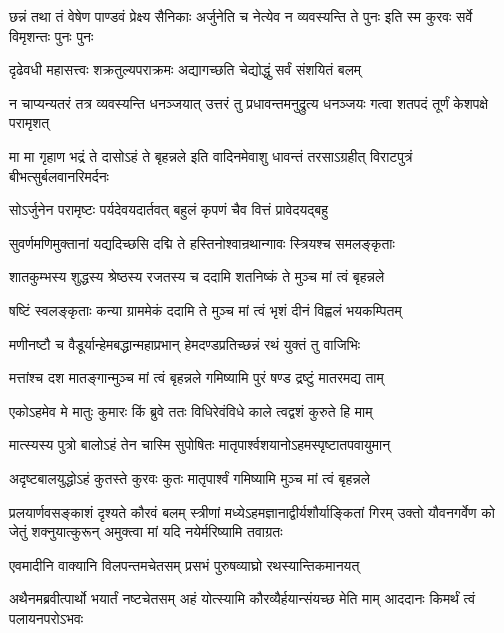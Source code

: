 
\threelineshloka
{छन्नं तथा तं वेषेण पाण्डवं प्रेक्ष्य सैनिकाः}
{अर्जुनेति च नेत्येव न व्यवस्यन्ति ते पुनः}
{इति स्म कुरवः सर्वे विमृशन्तः पुनः पुनः}


\twolineshloka
{दृढेवधी महासत्त्वः शक्रतुल्यपराक्रमः}
{अद्यागच्छति चेद्योद्धुं सर्वं संशयितं बलम्}


\onelineshloka
{न चाप्यन्यतरं तत्र व्यवस्यन्ति धनञ्जयात्}
\twolineshloka
{उत्तरं तु प्रधावन्तमनुद्रुत्य धनञ्जयः}
{गत्वा शतपदं तूर्णं केशपक्षे परामृशत्}


\threelineshloka
{मा मा गृहाण भद्रं ते दासोऽहं ते बृहन्नले}
{इति वादिनमेवाशु धावन्तं तरसाऽग्रहीत्}
{विराटपुत्रं बीभत्सुर्बलवानरिमर्दनः}


\twolineshloka
{सोऽर्जुनेन परामृष्टः पर्यदेवयदार्तवत्}
{बहुलं कृपणं चैव वित्तं प्रावेदयद्बहु}


\twolineshloka
{सुवर्णमणिमुक्तानां यद्यदिच्छसि दद्मि ते}
{हस्तिनोश्वान्रथान्गावः स्त्रियश्च समलङ्कृताः}


\twolineshloka
{शातकुम्भस्य शुद्धस्य श्रेष्ठस्य रजतस्य च}
{ददामि शतनिष्कं ते मुञ्च मां त्वं बृहन्नले}


\twolineshloka
{षष्टिं स्वलङ्कृताः कन्या ग्राममेकं ददामि ते}
{मुञ्च मां त्वं भृशं दीनं विह्वलं भयकम्पितम्}


\twolineshloka
{मणीनष्टौ च वैडूर्यान्हेमबद्धान्महाप्रभान्}
{हेमदण्डप्रतिच्छन्नं रथं युक्तं तु वाजिभिः}


\twolineshloka
{मत्तांश्च दश मातङ्गान्मुञ्च मां त्वं बृहन्नले}
{गमिष्यामि पुरं षण्ड द्रष्टुं मातरमद्य ताम्}


\twolineshloka
{एकोऽहमेव मे मातुः कुमारः किं ब्रुवे ततः}
{विधिरेवंविधे काले त्वद्वशं कुरुते हि माम्}


\twolineshloka
{मात्स्यस्य पुत्रो बालोऽहं तेन चास्मि सुपोषितः}
{मातृपार्श्वशयानोऽहमस्पृष्टातपवायुमान्}


\twolineshloka
{अदृष्टबालयुद्धोऽहं कुतस्ते कुरवः कुतः}
{मातृपार्श्वं गमिष्यामि मुञ्च मां त्वं बृहन्नले}


\onelineshloka
{प्रलयार्णवसङ्काशं दृश्यते कौरवं बलम्}
\threelineshloka
{स्त्रीणां मध्येऽहमज्ञानाद्वीर्यशौर्याङ्कितां गिरम्}
{उक्तो यौवनगर्वेण को जेतुं शक्नुयात्कुरून्}
{अमुक्त्वा मां यदि नयेर्मरिष्यामि तवाग्रतः}



\twolineshloka
{एवमादीनि वाक्यानि विलपन्तमचेतसम्}
{प्रसभं पुरुषव्याघ्रो रथस्यान्तिकमानयत्}


\onelineshloka
{अथैनमब्रवीत्पार्थो भयार्तं नष्टचेतसम्}
\twolineshloka
{अहं योत्स्यामि कौरव्यैर्हयान्संयच्छ मेति माम्}
{आददानः किमर्थं त्वं पलायनपरोऽभवः}


